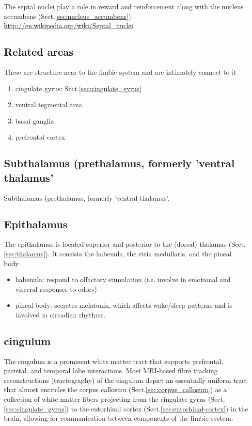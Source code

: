 The septal nuclei play a role in reward and reinforcement along with the nucleus
accumbens (Sect.\ref{sec:nucleus_accumbens}).
\url{http://en.wikipedia.org/wiki/Septal_nuclei}


\subsection{Related areas}

These are structure near to the limbic system and are intimately connect to it
\begin{enumerate}
  \item cingulate gyrus: Sect.\ref{sec:cingulate_gyrus}
  \item ventral tegmental area
  \item basal ganglia
  \item prefrontal cortex
\end{enumerate}

\subsection{Subthalamus (prethalamus, formerly 'ventral
thalamus'}
\label{sec:subthalamus}
\label{sec:prethalamus}

Subthalamus (prethalamus, formerly 'ventral
thalamus'.

\subsection{Epithalamus}
\label{sec:epithalamus}

The epithalamus is located superior and posterior to the (dorsal) thalamus
(Sect.\ref{sec:thalamus}). It consists the habenula, the stria medullaris, 
and the pineal body.
\begin{itemize}
  \item habenula: respond to olfactory stimulation (i.e. involve in emotional
  and visceral responses to odors)
  
  \item pineal body: secretes melatonin, which affects wake/sleep patterns and
  is involved in circadian rhythms.
\end{itemize}

\subsection{cingulum}
\label{sec:cingulum}

The cingulum is a prominent white matter tract that supports prefrontal,
parietal, and temporal lobe interactions.
Most MRI-based fibre tracking reconstructions (tractography) of the cingulum
depict an essentially uniform tract that almost encircles the corpus callosum
(Sect.\ref{sec:corpus_callosum}) as a collection of white matter fibers
projecting from the cingulate gyrus (Sect.\ref{sec:cingulate_gyrus}) to the
entorhinal cortex (Sect.\ref{sec:entorhinal-cortex}) in the brain, allowing for
communication between components of the limbic system.




